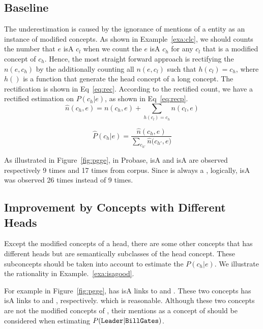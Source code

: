 \subsection{Baseline}
The underestimation is caused by the ignorance of mentions of a entity as an instance of modified concepts. As shown in Example~\ref{exa:clc}, we should counts the number that $e$ isA $c_{l}$ when we count the $e$ isA $c_{h}$ for any $c_l$ that is a modified concept of $c_h$.
Hence, the most straight forward approach is rectifying the $n(e, c_h)$ by the additionally counting 
all $n(e, c_l)$ such that $h(c_l)=c_h$, where $h()$ is a function that generate the head concept of a long concept. The rectification is shown in Eq~\ref{eq:rec}. According to the rectified count, we have a rectified estimation on $P(c_h|e)$, as shown in Eq~\ref{eq:recp}.
\begin{equation}
\hat{n}(c_h, e)={n}(c_h, e)+\sum_{ h(c_l)=c_h} n(c_l,e)
\label{eq:rec}
\end{equation}

\begin{equation}
\hat{P}(c_h|e)=\frac{\hat{n}(c_h, e)}{\sum_{c_{h'}}{\hat{n}(c_{h'}}, e)}
\label{eq:recp}
\end{equation}

\begin{example}
\label{exa:clc}
As illustrated in Figure~\ref{fig:pgge}, in Probase,  isA   and  isA  are observed respectively 9 times and 17 times from corpus. Since  is always a ,  logically,  isA  was observed 26 times instead of 9 times.
\end{example}


\subsection{Improvement by Concepts with Different Heads}
Except the modified concepts of a head, there are some other concepts that has different heads but  are semantically subclasses of the head concept. These subconcepts should be taken into account to estimate the ${P}(c_h|e)$.  We illustrate the rationality in Example.~\ref{exa:isagood}.

\begin{example}
\label{exa:isagood}
For example in Figure~\ref{fig:pgge},  has isA links to  and . These two concepts has isA links to  and , respectively.  which is reasonable. Although these two concepts are not the modified concepts of , their mentions as a concept of   should be considered when estimating $P(\at{Leader}|\at{Bill Gates})$.
\end{example}

